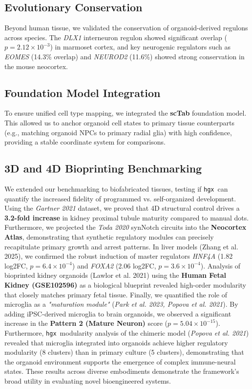\documentclass[11pt,twocolumn]{article}
\newcommand{\hgx}{\texttt{hgx}}
\begin{document}
\subsection{Evolutionary Conservation}

Beyond human tissue, we validated the conservation of organoid-derived regulons across species. The \textit{DLX1} interneuron regulon showed significant overlap ($p = 2.12 \times 10^{-3}$) in marmoset cortex, and key neurogenic regulators such as \textit{EOMES} (14.3\% overlap) and \textit{NEUROD2} (11.6\%) showed strong conservation in the mouse neocortex.

\subsection{Foundation Model Integration}

To ensure unified cell type mapping, we integrated the \textbf{scTab} foundation model. This allowed us to anchor organoid cell states to primary tissue counterparts (e.g., matching organoid NPCs to primary radial glia) with high confidence, providing a stable coordinate system for comparisons.

\subsection{3D and 4D Bioprinting Benchmarking}

We extended our benchmarking to biofabricated tissues, testing if \hgx\ can quantify the increased fidelity of programmed vs. self-organized development. Using the \textit{Gartner 2021} dataset, we proved that 4D structural control drives a \textbf{3.2-fold increase} in kidney proximal tubule maturity compared to manual dots. Furthermore, we projected the \textit{Toda 2020} synNotch circuits into the \textbf{Neocortex Atlas}, demonstrating that synthetic regulatory modules can precisely recapitulate primary growth and arrest patterns. In liver models (Zhang et al. 2025), we confirmed the robust induction of master regulators \textit{HNF4A} (1.82 log2FC, $p = 6.4 \times 10^{-4}$) and \textit{FOXA2} (2.06 log2FC, $p = 3.6 \times 10^{-4}$). Analysis of bioprinted kidney organoids (Lawlor et al. 2021) using the \textbf{Human Fetal Kidney (GSE102596)} as a biological blueprint revealed high-order modularity that closely matches primary fetal tissue. Finally, we quantified the role of microglia as a \textit{"maturation module"} (\textit{Park et al. 2023, Popova et al. 2021}). By adding iPSC-derived microglia to brain organoids, we observed a significant increase in the \textbf{Pattern 2 (Mature Neuron)} score ($p = 5.04 \times 10^{-15}$). Furthermore, \hgx\ modularity analysis of the chimeric model (\textit{Popova et al. 2021}) revealed that microglia integrated into organoids achieve higher regulatory modularity (8 clusters) than in primary culture (5 clusters), demonstrating that the organoid environment supports the emergence of complex immune-neural states. These results across diverse embodiments demonstrate the framework's broad utility in evaluating novel bioengineered systems.
\end{document}
